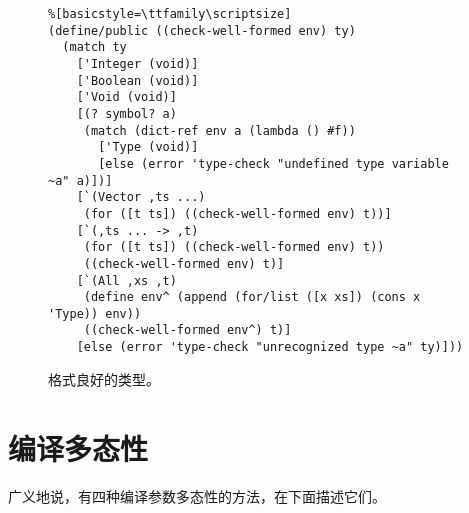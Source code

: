\documentclass[11pt]{book}
\begin{document}
\begin{figure}[tbp]
\begin{lstlisting}%[basicstyle=\ttfamily\scriptsize]
(define/public ((check-well-formed env) ty)
  (match ty
    ['Integer (void)]
    ['Boolean (void)]
    ['Void (void)]
    [(? symbol? a)
     (match (dict-ref env a (lambda () #f))
       ['Type (void)]
       [else (error 'type-check "undefined type variable ~a" a)])]
    [`(Vector ,ts ...)
     (for ([t ts]) ((check-well-formed env) t))]
    [`(,ts ... -> ,t)
     (for ([t ts]) ((check-well-formed env) t))
     ((check-well-formed env) t)]
    [`(All ,xs ,t)
     (define env^ (append (for/list ([x xs]) (cons x 'Type)) env))
     ((check-well-formed env^) t)]
    [else (error 'type-check "unrecognized type ~a" ty)]))
\end{lstlisting}
\caption{格式良好的类型。}
\label{fig:well-formed-types}
\end{figure}


\section{编译多态性}
\label{sec:compiling-poly}

广义地说，有四种编译参数多态性的方法，在下面描述它们。
\end{document}
